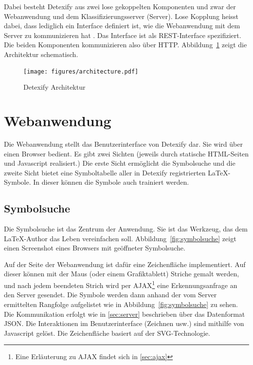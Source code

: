 Dabei besteht Detexify aus zwei lose gekoppelten Komponenten und zwar der Webanwendung und dem Klassifizierungsserver (Server). Lose Kopplung heisst dabei, dass lediglich ein Interface definiert ist, wie die Webanwendung mit dem Server zu kommunizieren hat \cite{Tilkov:2005p11813}. Das Interface ist als \ac{REST}-Interface spezifiziert. Die beiden Komponenten kommunizieren also über \ac{HTTP}. Abbildung~\ref{fig:architecture} zeigt die Architektur schematisch.

\begin{figure}[htbp]
  \centering \texttt{[image: figures/architecture.pdf]}
  \caption{Detexify Architektur}
  \label{fig:architecture}
\end{figure}

\section{Webanwendung} %
\label{sec:webanwendung}


Die Webanwendung stellt das Benutzerinterface von Detexify dar. Sie wird über einen Browser bedient. Es gibt zwei Sichten (jeweils durch statische \ac{HTML}-Seiten und Javascript realisiert.) Die erste Sicht ermöglicht die Symbolsuche und die zweite Sicht bietet eine Symboltabelle aller in Detexify registrierten \LaTeX-Symbole. In dieser können die Symbole auch trainiert werden.

\subsection{Symbolsuche} %
\label{sub:symbolsuche}

Die Symbolsuche ist das Zentrum der Anwendung. Sie ist das Werkzeug, das dem \LaTeX-Author das Leben vereinfachen soll. Abbildung~\ref{fig:symbolsuche} zeigt einen Screenshot eines Browsers mit geöffneter Symbolsuche.

Auf der Seite der Webanwendung ist dafür eine Zeichenfläche implementiert. Auf dieser können mit der Maus (oder einem Grafiktablett) Striche gemalt werden, und nach jedem beendeten Strich wird per AJAX\footnote{Eine Erläuterung zu AJAX findet sich in \ref{sec:ajax}} eine Erkennungsanfrage an den Server gesendet. Die Symbole werden dann anhand der vom Server ermittelten Rangfolge aufgelistet wie in Abbildung~\ref{fig:symbolsuche} zu sehen. Die Kommunikation erfolgt wie in \ref{sec:server} beschrieben über das Datenformat \ac{JSON}. Die Interaktionen im Benutzerinterface (Zeichnen usw.) sind mithilfe von Javascript gelöst. Die Zeichenfläche basiert auf der \ac{SVG}-Technologie.

